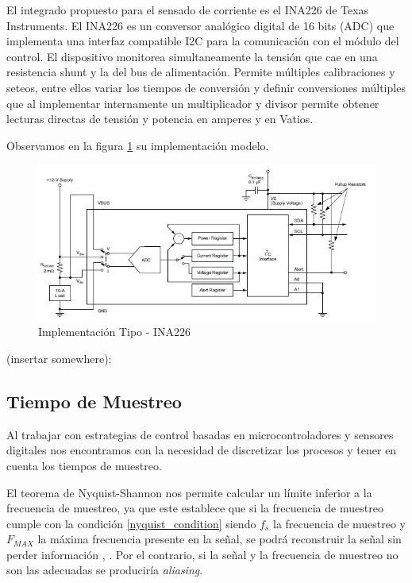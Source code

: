 \documentclass[10pt,a4paper]{article}
\begin{document}
\noindent El integrado propuesto para el sensado de corriente es el INA226 de
Texas Instruments. El INA226 es un conversor analógico digital de 16 bits (ADC)
que implementa una interfaz compatible I2C para la comunicación con el módulo
del control. El dispositivo monitorea simultaneamente la tensión que cae en una
resistencia shunt y la del bus de alimentación. Permite múltiples calibraciones
y seteos, entre ellos variar los tiempos de conversión y definir conversiones
múltiples que al implementar internamente un multiplicador y divisor permite
obtener lecturas directas de tensión y potencia en amperes y en Vatios.

Observamos en la figura \ref{fig:ina226-commonimplementation} su implementación
modelo. 

\begin{figure}[h!]
    \begin{center}
	\includegraphics[width=0.7\linewidth]{assets/INA226-Common_Implementation}
	\caption{Implementación Tipo - INA226}
	\label{fig:ina226-commonimplementation}
    \end{center}	
\end{figure}



(insertar somewhere):
\subsection{Tiempo de Muestreo}
Al trabajar con estrategias de control basadas en microcontroladores y sensores
digitales nos encontramos con la necesidad de discretizar los procesos y tener
en cuenta los tiempos de muestreo.

El teorema de Nyquist-Shannon nos permite calcular un límite inferior a la
frecuencia de muestreo, ya que este establece que si la frecuencia de muestreo
cumple con la condición \ref{nyquist_condition} siendo $f_s$ la frecuencia de
muestreo y $F_{MAX}$ la máxima frecuencia presente en la señal, se podrá
reconstruir la señal sin perder información \cite{Nyquist1928},
\cite{Shannon1949}.  Por el contrario, si la señal y la frecuencia de muestreo
no son las adecuadas se produciría \emph{aliasing}.
\end{document}

